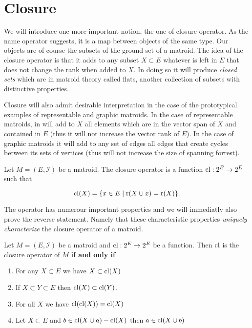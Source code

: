 \section{Closure}


We will introduce one more important notion, the one of closure operator. As the name operator suggests, it is a map between objects of the same type. Our objects are of course the subsets of the ground set of a matroid. The idea of the closure operator is that it adds to any subset $X \subset E$ whatever is left in $E$ that does not change the rank when added to $X$. In doing so it will produce \textit{closed sets} which are in matroid theory called flats, another collection of subsets with distinctive properties. 

Closure will also admit desirable interpretation in the case of the prototypical examples of representable and graphic matroids. In the case of representable matroids, in will add to $X$ all elements which are in the vector span of $X$ and contained in $E$ (thus it will not increase the vector rank of $E$). In the case of graphic matroids it will add to any set of edges all edges that create cycles between its sets of vertices (thus will not increase the size of spanning forrest).

\begin{defn}
    Let $M = (E, \mathcal{I})$ be a matroid. The closure operator is a function $\mathrm{cl}: 2^E \to 2^E$ such that

    $$\mathrm{cl}(X) = \{x \in E\; | \; \text{r}(X \cup x) = \text{r}(X) \}.$$

    
\end{defn}

The operator has numerour important properties and we will immediatly also prove the reverse statement. Namely that these characteristic properties \textit{uniquely characterize} the closure operator of a matroid.

\begin{theorem}
Let $M = (E, \mathcal{I})$ be a matroid and $\mathrm{cl}: 2^E \to 2^E$ be a function. Then $\mathrm{cl}$ is the closure operator of $M$ \textbf{if and only if}

\begin{enumerate}
    \item For any $X \subset E$ we have $X \subset \mathrm{cl} (X)$
    \item If $X \subset Y \subset E$ then $\mathrm{cl}(X) \subset \mathrm{cl}(Y)$.
    \item For all $X$ we have $\mathrm{cl}(\mathrm{cl}(X)) = \mathrm{cl}(X)$

    \item Let $X \subset E$ and $b \in 
    \mathrm{cl}(X \cup a) - \mathrm{cl}(X)$ then $a \in \mathrm{cl}(X \cup b)$
\end{enumerate}
\end{theorem}


